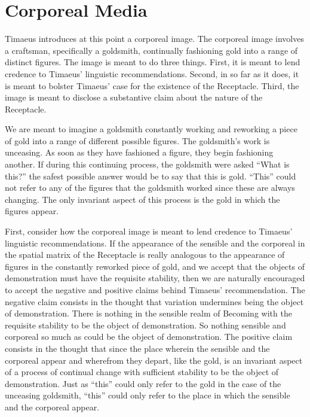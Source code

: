
\section{Corporeal Media} %
\label{sec:corporeal_media}

Timaeus introduces at this point a corporeal image. The corporeal image involves a craftsman, specifically a goldsmith, continually fashioning gold into a range of distinct figures. The image is meant to do three things. First, it is meant to lend credence to Timaeus' linguistic recommendations. Second, in so far as it does, it is meant to bolster Timaeus' case for the existence of the Receptacle. Third, the image is meant to disclose a substantive claim about the nature of the Receptacle.

We are meant to imagine a goldsmith constantly working and reworking a piece of gold into a range of different possible figures. The goldsmith's work is unceasing. As soon as they have fashioned a figure, they begin fashioning another. If during this continuing process, the goldsmith were asked ``What is this?'' the safest possible answer would be to say that this is gold. ``This'' could not refer to any of the figures that the goldsmith worked since these are always changing. The only invariant aspect of this process is the gold in which the figures appear.

First, consider how the corporeal image is meant to lend credence to Timaeus' linguistic recommendations. If the appearance of the sensible and the corporeal in the spatial matrix of the Receptacle is really analogous to the appearance of figures in the constantly reworked piece of gold, and we accept that the objects of demonstration must have the requisite stability, then we are naturally encouraged to accept the negative and positive claims behind Timaeus' recommendation. The negative claim consists in the thought that variation undermines being the object of demonstration. There is nothing in the sensible realm of Becoming with the requisite stability to be the object of demonstration. So nothing sensible and corporeal so much as could be the object of demonstration. The positive claim consists in the thought that since the place wherein the sensible and the corporeal appear and wherefrom they depart, like the gold, is an invariant aspect of a process of continual change with sufficient stability to be the object of demonstration. Just as ``this'' could only refer to the gold in the case of the unceasing goldsmith, ``this'' could only refer to the place in which the sensible and the corporeal appear.

